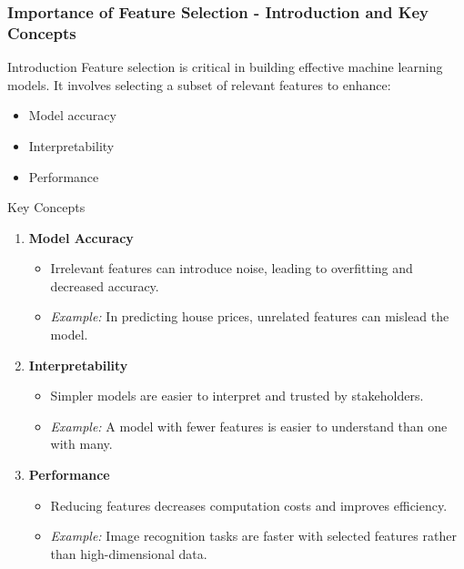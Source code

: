 \documentclass[aspectratio=169]{beamer}
\begin{document}
\begin{frame}[fragile]
    \frametitle{Importance of Feature Selection - Introduction and Key Concepts}
    \begin{block}{Introduction}
        Feature selection is critical in building effective machine learning models. It involves selecting a subset of relevant features to enhance:
        \begin{itemize}
            \item Model accuracy
            \item Interpretability
            \item Performance
        \end{itemize}
    \end{block}

    \begin{block}{Key Concepts}
        \begin{enumerate}
            \item \textbf{Model Accuracy}
            \begin{itemize}
                \item Irrelevant features can introduce noise, leading to overfitting and decreased accuracy.
                \item \textit{Example:} In predicting house prices, unrelated features can mislead the model.
            \end{itemize}
            \item \textbf{Interpretability}
            \begin{itemize}
                \item Simpler models are easier to interpret and trusted by stakeholders.
                \item \textit{Example:} A model with fewer features is easier to understand than one with many.
            \end{itemize}
            \item \textbf{Performance}
            \begin{itemize}
                \item Reducing features decreases computation costs and improves efficiency.
                \item \textit{Example:} Image recognition tasks are faster with selected features rather than high-dimensional data.
            \end{itemize}
        \end{enumerate}
    \end{block}
\end{frame}
\end{document}
